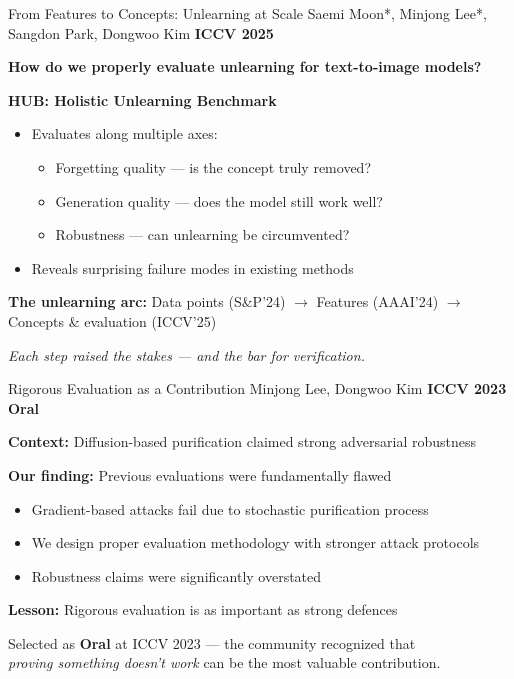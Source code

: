 \documentclass[aspectratio=169,11pt]{beamer}
\newcommand{\papercite}[1]{{\scriptsize\color{mutedText}#1}}
\newcommand{\venue}[1]{{\small\textcolor{postechBlue}{\textbf{#1}}}}
\newcommand{\badge}[1]{\colorbox{anuGold}{\scriptsize\color{white}\textbf{#1}}}
\begin{document}
\begin{frame}{From Features to Concepts: Unlearning at Scale}
  \papercite{Saemi Moon*, Minjong Lee*, Sangdon Park, Dongwoo Kim \hfill \venue{ICCV 2025}}
  \vspace{8pt}

  \textbf{How do we properly evaluate unlearning for text-to-image models?}
  \vspace{6pt}

  \textbf{HUB: Holistic Unlearning Benchmark}
  \begin{itemize}
    \item Evaluates along multiple axes:
    \begin{itemize}
      \item[-] Forgetting quality --- is the concept truly removed?
      \item[-] Generation quality --- does the model still work well?
      \item[-] Robustness --- can unlearning be circumvented?
    \end{itemize}
    \item Reveals surprising failure modes in existing methods
  \end{itemize}
  \vspace{8pt}

  \textbf{The unlearning arc:} Data points (S\&P'24) $\to$ Features (AAAI'24) $\to$ Concepts \& evaluation (ICCV'25)

  \vspace{4pt}
  {\small\textit{Each step raised the stakes --- and the bar for verification.}}
\end{frame}

\begin{frame}{Rigorous Evaluation as a Contribution}
  \papercite{Minjong Lee, Dongwoo Kim \hfill \venue{ICCV 2023} \badge{Oral}}
  \vspace{8pt}

  \textbf{Context:} Diffusion-based purification claimed strong adversarial robustness
  \vspace{6pt}

  \textbf{Our finding:} Previous evaluations were \alert{fundamentally flawed}
  \begin{itemize}
    \item Gradient-based attacks fail due to stochastic purification process
    \item We design proper evaluation methodology with stronger attack protocols
    \item Robustness claims were significantly overstated
  \end{itemize}
  \vspace{8pt}

  \textbf{Lesson:} Rigorous evaluation is as important as strong defences

  \vspace{4pt}
  {\small Selected as \badge{Oral} at ICCV 2023 --- the community recognized that\\
  \textit{proving something doesn't work} can be the most valuable contribution.}
\end{frame}
\end{document}
